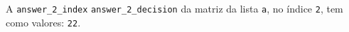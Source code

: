 \documentclass[12pt,varwidth=16cm,border=1pt]{standalone}
\begin{document}
A \verb+answer_2_index+ \verb+answer_2_decision+ da matriz da lista \verb+a+, no índice \verb+2+, tem como valores: \verb+22+.

\questiomtrue
\end{document}
